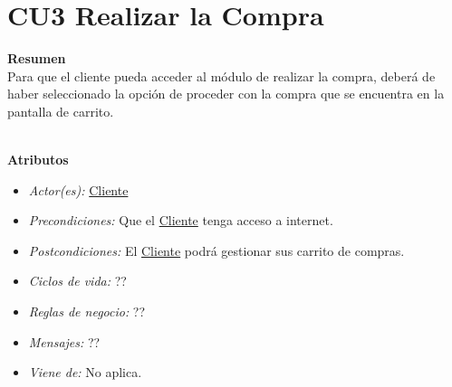 \hypertarget{CU2}{}
\section{CU3 Realizar la Compra}

\noindent \textbf{Resumen}\\

Para que el cliente pueda acceder al módulo de realizar la compra, deberá de haber seleccionado la opción de proceder con la compra que se encuentra en la pantalla de carrito.

\noindent \textbf{\\Atributos}

\begin{itemize}
	
	\item \textit{Actor(es):} \hyperlink{A:Cliente}{Cliente}
	\item \textit{Precondiciones:} Que el \hyperlink{A:Cliente}{Cliente} tenga acceso a internet. 
	\item \textit{Postcondiciones:} El \hyperlink{A:Cliente}{Cliente} podrá gestionar sus carrito de compras.
	\item \textit{Ciclos de vida:} ?? 
	\item \textit{Reglas de negocio:} ??
	\item \textit{Mensajes:} ??
	\item \textit{Viene de:} No aplica.
	
\end{itemize} 
